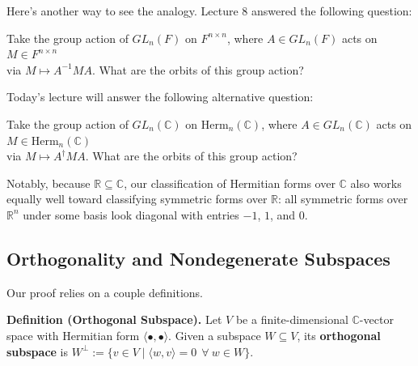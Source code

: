 \begin{remark}
    Here's another way to see the analogy.  Lecture 8 answered the following question:
    \begin{center}
        Take the group action of $GL_n(F)$ on $F^{n \times n}$, where $A \in GL_n(F)$ acts on $M \in F^{n\times n}$ \\ via $M \mapsto A^{-1}MA$.  What are the orbits of this group action?
    \end{center}
    Today's lecture will answer the following alternative question:
    \begin{center}
        Take the group action of $GL_n(\mathbb{C})$ on $\mathrm{Herm}_n(\mathbb{C})$, where $A \in GL_n(\mathbb{C})$ acts on $M \in \mathrm{Herm}_n(\mathbb{C})$ \\ via $M \mapsto A^{\dagger}MA$.  What are the orbits of this group action?
    \end{center}
\end{remark}

Notably, because $\mathbb{R} \subseteq \mathbb{C}$, our classification of Hermitian forms over $\mathbb{C}$ also works equally well toward classifying symmetric forms over $\mathbb{R}$: all symmetric forms over $\mathbb{R}^n$ under some basis look diagonal with entries $-1$, $1$, and $0$.



\subsection{Orthogonality and Nondegenerate Subspaces}



Our proof relies on a couple definitions.

\textbf{Definition (Orthogonal Subspace).} Let $V$ be a finite-dimensional $\mathbb{C}$-vector space with Hermitian form $\langle \bullet, \bullet \rangle$.  Given a subspace $W \subseteq V$, its \textbf{orthogonal subspace} is $W^{\perp} := \{ v \in V \mid \langle w, v \rangle = 0 ~~ \forall \ w \in W\}$.

